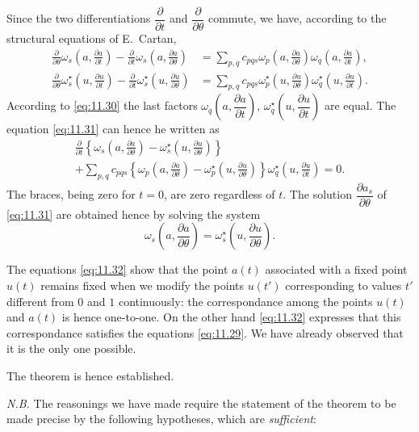 \documentclass[leqno,11pt]{book}
\numberwithin{equation}{chapter}
\newcommand{\pd}{\partial}
\theoremstyle{shape1}
\theoremstyle{shapesmall}
\newcommand{\str}{^{\star}}
\newcommand{\somespace}{\vspace{9pt}}
\begin{document}
Since the two differentiations $\dfrac{\pd}{\pd t}$ and $\dfrac{\pd}{\pd\theta}$ commute, we have, according to the structural equations of E.~Cartan,
\begin{align*}
  \frac{\pd}{\pd\theta}\omega_{s}\left(a,\frac{\pd a}{\pd t}\right)-\frac{\pd}{\pd t}\omega_{s}\left(a,\frac{\pd a}{\pd\theta}\right)&=\sum_{p,q}c_{pqs}\omega_{p}\left(a,\frac{\pd a}{\pd \theta}\right)\omega_{q}\left(a,\frac{\pd a}{\pd t}\right),\\
  \frac{\pd}{\pd\theta}\omega\str_{s}\left(u,\frac{\pd u}{\pd t}\right)-\frac{\pd}{\pd t}\omega\str_{s}\left(u,\frac{\pd u}{\pd\theta}\right)&=\sum_{p,q}c_{pqs}\omega\str_{p}\left(u,\frac{\pd u}{\pd \theta}\right)\omega\str_{q}\left(u,\frac{\pd u}{\pd t}\right).
\end{align*}
According to \eqref{eq:11.30} the last factors $\omega_{q}\left(a,\dfrac{\pd a}{\pd t}\right)$, $\omega\str_{q}\left(u,\dfrac{\pd u}{\pd t}\right)$ are equal. The equation \eqref{eq:11.31} can hence he written as
\[\begin{multlined}
  \frac{\pd}{\pd t}\left\{\omega_{s}\left(a,\frac{\pd a}{\pd\theta}\right)-\omega\str_{s}\left(u,\frac{\pd u}{\pd\theta}\right)\right\}\\
  +\sum_{p,q}c_{pqs}\left\{\omega_{p}\left(a,\frac{\pd a}{\pd \theta}\right)-\omega\str_{p}\left(u,\frac{\pd u}{\pd\theta}\right)\right\}\omega_{q}\str\left(u,\frac{\pd u}{\pd t}\right)=0.
\end{multlined}\]
The braces, being zero for $t=0$, are zero regardless of $t$. The solution $\dfrac{\pd a_{s}}{\pd\theta}$ of \eqref{eq:11.31} are obtained hence by solving the system
\begin{equation}
  \label{eq:11.32}
  \omega_{s}\left(a,\frac{\pd a}{\pd\theta}\right)=\omega_{s}\str\left(u,\frac{\pd u}{\pd\theta}\right).
\end{equation}

The equations \eqref{eq:11.32} show that the point $a(t)$ associated with a fixed point $u(t)$ remains fixed when we modify the points $u(t')$ corresponding to values $t'$ different from $0$ and $1$ continuously: the correspondance among the points $u(t)$ and $a(t)$ is hence one-to-one. On the other hand \eqref{eq:11.32} expresses that this correspondance satisfies the equations \eqref{eq:11.29}. We have already observed that it is the only one possible.

The theorem is hence established.

\somespace

\emph{N.B.} The reasonings we have made require the statement of the theorem to be made precise by the following hypotheses, which are \emph{sufficient}:
\end{document}
